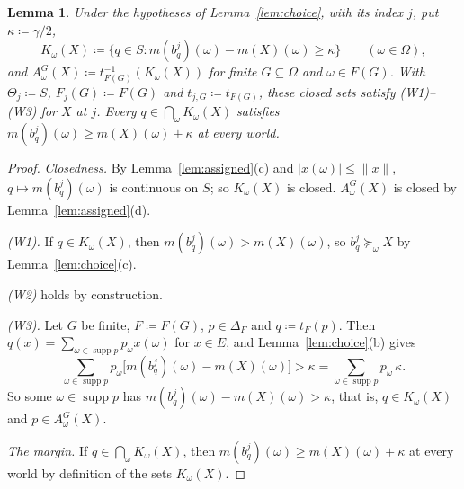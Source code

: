 \documentclass[11pt]{article}
\newtheorem{lemma}[theorem]{Lemma}
\theoremstyle{definition}
\DeclareMathOperator{\supp}{supp}
\begin{document}
\begin{lemma}\label{lem:witnesses}
Under the hypotheses of Lemma~\ref{lem:choice}, with its index $j$, put $\kappa\coloneqq\gamma/2$,
\[
K_\omega(X)\coloneqq\bigl\{q\in S:m(b^j_q)(\omega)-m(X)(\omega)\ge \kappa\bigr\}\qquad(\omega\in\Omega),
\]
and $A^G_\omega(X)\coloneqq t_{F(G)}^{-1}(K_\omega(X))$ for finite $G\subseteq\Omega$ and $\omega\in F(G)$. With $\Theta_j\coloneqq S$, $F_j(G)\coloneqq F(G)$ and $t_{j,G}\coloneqq t_{F(G)}$, {\color{red}these closed sets satisfy (W1)--(W3) for $X$ at $j$.} Every $q\in\bigcap_\omega K_\omega(X)$ satisfies $m(b^j_q)(\omega)\ge m(X)(\omega)+\kappa$ at every world.
\end{lemma}
\begin{proof}
\emph{Closedness.} By Lemma~\ref{lem:assigned}(c) and $|x(\omega)|\le\|x\|$, $q\mapsto m(b^j_q)(\omega)$ is continuous on $S$; so $K_\omega(X)$ is closed. $A^G_\omega(X)$ is closed by Lemma~\ref{lem:assigned}(d).

\emph{(W1).} If $q\in K_\omega(X)$, then $m(b^j_q)(\omega)>m(X)(\omega)$, so $b^j_q\succeq_\omega X$ by Lemma~\ref{lem:choice}(c).

\emph{(W2)} holds by construction.

\emph{(W3).} Let $G$ be finite, $F\coloneqq F(G)$, $p\in\Delta_F$ and $q\coloneqq t_F(p)$. Then $q(x)=\sum_{\omega\in\supp p}p_\omega x(\omega)$ for $x\in E$, and Lemma~\ref{lem:choice}(b) gives
\[
\sum_{\omega\in\supp p}p_\omega\bigl[m(b^j_q)(\omega)-m(X)(\omega)\bigr]>\kappa=\sum_{\omega\in\supp p}p_\omega\,\kappa .
\]
So some $\omega\in\supp p$ has $m(b^j_q)(\omega)-m(X)(\omega)>\kappa$, that is, $q\in K_\omega(X)$ and $p\in A^G_\omega(X)$.

{\color{red}\emph{The margin.} If $q\in\bigcap_\omega K_\omega(X)$, then $m(b^j_q)(\omega)\ge m(X)(\omega)+\kappa$ at every world by definition of the sets $K_\omega(X)$.}
\end{proof}
\end{document}
